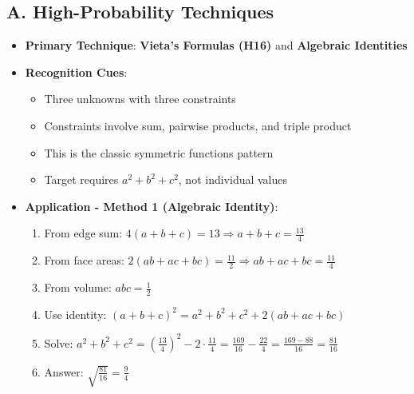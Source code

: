 \documentclass[12pt]{article}
\begin{document}
\begin{techniquesbox}
\subsection*{A. High-Probability Techniques}
\begin{itemize}[leftmargin=*]
    \item \textbf{Primary Technique}: \textbf{Vieta's Formulas (H16)} and \textbf{Algebraic Identities}
    \item \textbf{Recognition Cues}: 
    \begin{itemize}
        \item Three unknowns with three constraints
        \item Constraints involve sum, pairwise products, and triple product
        \item This is the classic symmetric functions pattern
        \item Target requires $a^2+b^2+c^2$, not individual values
    \end{itemize}
    \item \textbf{Application - Method 1 (Algebraic Identity)}: 
    \begin{enumerate}
        \item From edge sum: $4(a+b+c) = 13 \Rightarrow a+b+c = \frac{13}{4}$
        \item From face areas: $2(ab+ac+bc) = \frac{11}{2} \Rightarrow ab+ac+bc = \frac{11}{4}$
        \item From volume: $abc = \frac{1}{2}$
        \item Use identity: $(a+b+c)^2 = a^2+b^2+c^2 + 2(ab+ac+bc)$
        \item Solve: $a^2+b^2+c^2 = \left(\frac{13}{4}\right)^2 - 2 \cdot \frac{11}{4} = \frac{169}{16} - \frac{22}{4} = \frac{169-88}{16} = \frac{81}{16}$
        \item Answer: $\sqrt{\frac{81}{16}} = \frac{9}{4}$
    \end{enumerate}
\end{itemize}


\end{techniquesbox}
\end{document}
